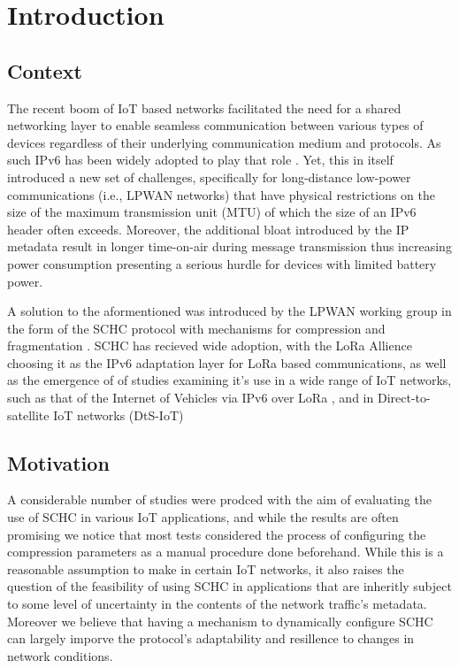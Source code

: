 \documentclass[12pt]{dalthesis}
\begin{document}
\mainmatter

\chapter{Introduction}
	\section{Context}
		\par{
			The recent boom of IoT based networks facilitated the need for a shared networking layer to enable seamless 
			communication between various types of devices regardless of their underlying communication medium and protocols. As such IPv6 has been widely adopted to play that role \cite{8355231}. Yet, this in itself introduced a new set of challenges, specifically for long-distance low-power
communications (i.e., LPWAN networks) that have physical restrictions on the size of the maximum transmission unit (MTU) of which the size of an IPv6 header often exceeds. Moreover, the additional 
bloat introduced by the IP metadata result in longer time-on-air during message transmission thus increasing power consumption \cite{alhajhassan:hal-04244739}
			presenting a serious hurdle for devices with limited battery power.
		}
		\par{
			A solution to the aformentioned was introduced by the LPWAN working group in the form of the SCHC protocol
			with mechanisms for compression and fragmentation \cite{rfc8724}. SCHC has recieved wide adoption, with the LoRa Allience choosing
			it as the IPv6 adaptation layer for LoRa based communications, as well as the emergence of 
			of studies examining it's use in a wide range of IoT networks, such as that of the Internet of Vehicles via IPv6 over LoRa \cite{8355231}, 
			and in Direct-to-satellite IoT networks (DtS-IoT) \cite{dts}
		}

		\section{Motivation}

		\par{

	
		A considerable number of studies  were prodced with the aim of evaluating the use of SCHC in various IoT applications, and
		while the results are often promising we notice that most tests considered the process of configuring the compression parameters as
		a manual procedure done beforehand. While this is a reasonable assumption to make in certain IoT networks, it also
		raises the question of the feasibility of using SCHC in applications that are inheritly subject to some level of uncertainty
		in the contents of the network traffic's metadata. Moreover we believe that having a mechanism to dynamically configure 
		SCHC can largely imporve the protocol's adaptability and resillence to changes in network conditions.
	}
\end{document}
